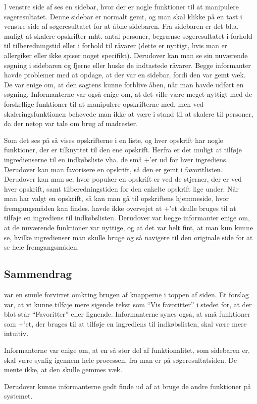 I venstre side af  ses en sidebar, hvor der er nogle funktioner til at manipulere søgeresultatet. Denne sidebar er normalt gemt, og man skal klikke på en tast i venstre side af søgeresultatet for at åbne sidebaren. Fra sidebaren er det bl.a. muligt at skalere opskrifter mht. antal personer, begrænse søgeresultatet i forhold til tilberedningstid eller i forhold til råvarer (dette er nyttigt, hvis man \fx er allergiker eller ikke spiser noget specifikt). Derudover kan man se sin nuværende søgning i sidebaren og fjerne eller huske de indtastede råvarer. Begge informanter havde problemer med at opdage, at der var en sidebar, fordi den var gemt væk. De var enige om, at den sagtens kunne forblive åben, når man havde udført en søgning. Informanterne var også enige om, at det ville være meget nyttigt med de forskellige funktioner til at manipulere opskrifterne med, men \fx ved skaleringsfunktionen behøvede man ikke at være i stand til at skalere til  personer, da der netop var tale om brug af madrester. 

Som det ses på  så vises opskrifterne i en liste, og hver opskrift har nogle funktioner, der er tilknyttet til den ene opskrift. Herfra er det muligt at tilføje ingredienserne til en indkøbsliste vha. de små +'er ud for hver ingrediens. Derudover kan man favorisere en opskrift, så den er gemt i favoritlisten. Derudover kan man se, hvor populær en opskrift er ved de stjerner, der er ved hver opskrift, samt tilberedningstiden for den enkelte opskrift lige under. Når man har valgt en opskrift, så kan man gå til opskriftens hjemmeside, hvor fremgangsmåden kan findes. \Informantet{} havde ikke overvejet at +'et skulle bruges til at tilføje en ingrediens til indkøbslisten. Derudover var begge informanter enige om, at de nuværende funktioner var nyttige, og at det var helt fint, at man kun kunne se, hvilke ingredienser man skulle bruge og så navigere til den originale side for at se hele fremgangsmåden.

\subsection{Sammendrag}
\Informantet{} var en smule forvirret omkring brugen af knapperne i toppen af siden. Et forslag var, at vi kunne tilføje mere sigende tekst som ``Vis favoritter'' i stedet for, at der blot står ``Favoritter'' eller lignende. Informanterne synes også, at små funktioner som +'et, der bruges til at tilføje en ingrediens til indkøbslisten, skal være mere intuitiv.

Informanterne var enige om, at en så stor del af funktionalitet, som sidebaren er, skal være synlig igennem hele processen, fra man er på søgeresultatsiden. De mente ikke, at den skulle gemmes væk.

Derudover kunne informanterne godt finde ud af at bruge de andre funktioner på systemet.